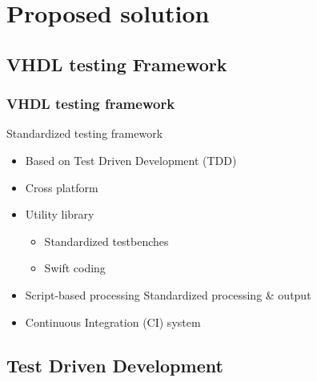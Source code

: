 \documentclass[british,10pt]{beamer}
\begin{document}
\section{Proposed solution}

\subsection{VHDL testing Framework}

\begin{frame}\frametitle{VHDL testing framework}
Standardized testing framework
\begin{itemize}
\item Based on Test Driven Development (TDD)
\item Cross platform
\item Utility library
\begin{itemize}
\item Standardized testbenches
\item Swift coding
\end{itemize}
\item Script-based processing  Standardized processing \& output
\item Continuous Integration (CI) system
\end{itemize}
\end{frame}

\subsection{Test Driven Development}
\end{document}
